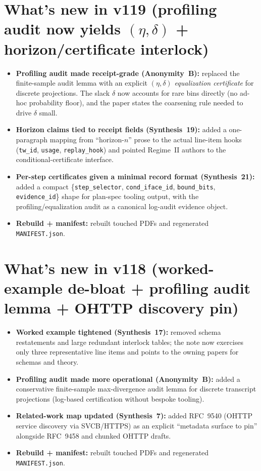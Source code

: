 \documentclass[11pt]{article}
\begin{document}
\section{What's new in v119 (profiling audit now yields $(\eta,\delta)$ + horizon/certificate interlock)}
\begin{itemize}[leftmargin=*]
\item \textbf{Profiling audit made receipt-grade (Anonymity~B):} replaced the finite-sample audit lemma with an explicit \emph{$(\eta,\delta)$ equalization certificate} for discrete projections. The slack $\delta$ now accounts for rare bins directly (no ad-hoc probability floor), and the paper states the coarsening rule needed to drive $\delta$ small.
\item \textbf{Horizon claims tied to receipt fields (Synthesis~19):} added a one-paragraph mapping from ``horizon-$n$'' prose to the actual line-item hooks (\texttt{tw\_id}, \texttt{usage}, \texttt{replay\_hook}) and pointed Regime~II authors to the conditional-certificate interface.
\item \textbf{Per-step certificates given a minimal record format (Synthesis~21):} added a compact \{\texttt{step\_selector}, \texttt{cond\_iface\_id}, \texttt{bound\_bits}, \texttt{evidence\_id}\} shape for plan-spec tooling output, with the profiling/equalization audit as a canonical log-audit evidence object.
\item \textbf{Rebuild + manifest:} rebuilt touched PDFs and regenerated \texttt{MANIFEST.json}.
\end{itemize}



\section{What's new in v118 (worked-example de-bloat + profiling audit lemma + OHTTP discovery pin)}
\begin{itemize}[leftmargin=*]
\item \textbf{Worked example tightened (Synthesis~17):} removed schema restatements and large redundant interlock tables; the note now exercises only three representative line items and points to the owning papers for schemas and theory.
\item \textbf{Profiling audit made more operational (Anonymity~B):} added a conservative finite-sample max-divergence audit lemma for discrete transcript projections (log-based certification without bespoke tooling).
\item \textbf{Related-work map updated (Synthesis~7):} added RFC~9540 (OHTTP service discovery via SVCB/HTTPS) as an explicit ``metadata surface to pin'' alongside RFC~9458 and chunked OHTTP drafts.
\item \textbf{Rebuild + manifest:} rebuilt touched PDFs and regenerated \texttt{MANIFEST.json}.
\end{itemize}
\end{document}
